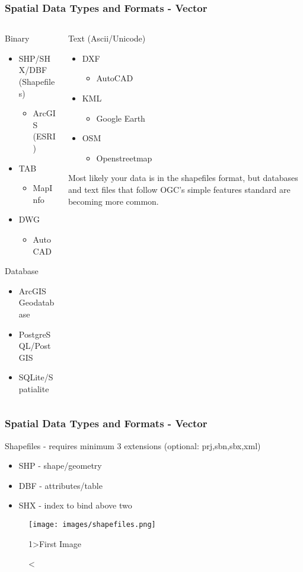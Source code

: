 \documentclass[11pt]{beamer}
\begin{document}
\begin{frame}
\frametitle{Spatial Data Types and Formats - Vector}
\begin{columns}[t]
\begin{column}{5cm}
Binary
\begin{itemize}
\item SHP/SHX/DBF (Shapefiles)
\begin{itemize}
\item ArcGIS (ESRI)
\end{itemize}
\item TAB
\begin{itemize}
\item  MapInfo
\end{itemize}
\item DWG
\begin{itemize}
\item  AutoCAD
\end{itemize}
\end{itemize}
Database
\begin{itemize}
\item  ArcGIS Geodatabase
\item  PostgreSQL/PostGIS
\item  SQLite/Spatialite
\end{itemize}
\end{column}
\begin{column}{5cm}
Text (Ascii/Unicode)
\begin{itemize}
\item DXF
\begin{itemize}
\item  AutoCAD
\end{itemize}
\item KML
\begin{itemize}
\item Google Earth
\end{itemize}
\item OSM
\begin{itemize}
\item  Openstreetmap
\end{itemize}
\end{itemize}
\bigskip
Most likely your data is in the shapefiles format, but databases and text files that follow OGC's simple features standard are becoming more common.
\end{column}
\end{columns}
\end{frame}

\begin{frame}
\frametitle{Spatial Data Types and Formats - Vector}
Shapefiles - requires minimum 3 extensions (optional: prj,sbn,sbx,xml)
\begin{itemize}
\item SHP - shape/geometry
\item DBF - attributes/table
\item SHX - index to bind above two
\end{itemize}
\begin{figure}
\texttt{[image: images/shapefiles.png]}
\caption<1>{First Image}
\end{figure}
\end{frame}
\end{document}
